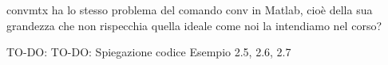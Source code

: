 \begin{tcolorbox}[colback=red!5!white,colframe=red!75!black]
convmtx ha lo stesso problema del comando conv in Matlab, cioè della sua grandezza che non rispecchia quella ideale come noi la intendiamo nel corso? \newline 

\end{tcolorbox}

\label{Domanda 4} 

\begin{tcolorbox}[colback=green!5!white,colframe=green!75!black]
TO-DO: TO-DO: Spiegazione codice Esempio 2.5, 2.6, 2.7 
\end{tcolorbox} 

\newpage 
